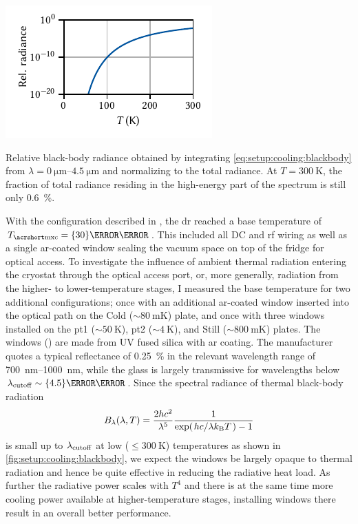 \begin{marginfigure}
    \centering
    \includegraphics{img/pdf/setup/black_body_radiance}
    \caption[]{
        Relative black-body radiance obtained by integrating \cref{eq:setup:cooling:blackbody} from $\lambda = \qtyrange{0}{4.5}{\micro\meter}$ and normalizing to the total radiance.
        At $T=\qty{300}{\kelvin}$, the fraction of total radiance residing in the high-energy part of the spectrum is still only \qty{0.6}{\percent}.
    }
    \label{fig:setup:cooling:blackbody}
\end{marginfigure}

With the configuration described in , the \gls{dr} reached a base temperature of $\Tmxc = \qty{30}{\milli\kelvin}$.
This included all DC and \gls{rf} wiring as well as a single \gls{ar}-coated window sealing the vacuum space on top of the fridge for optical access.
To investigate the influence of ambient thermal radiation entering the cryostat through the optical access port, or, more generally, radiation from the higher- to lower-temperature stages, I measured the base temperature for two additional configurations; once with an additional \gls{ar}-coated window inserted into the optical path on the Cold ($\sim\qty{80}{\milli\kelvin}$) plate, and once with three windows installed on the \gls{pt1} ($\sim\qty{50}{\kelvin}$), \gls{pt2} ($\sim\qty{4}{\kelvin}$), and Still ($\sim\qty{800}{\milli\kelvin}$) plates.
The windows (\thewindow) are made from UV fused silica with \gls{ar} coating.
The manufacturer quotes a typical reflectance of \qty{0.25}{\percent} in the relevant wavelength range of \qtyrange{700}{1000}{\nano\meter}, while the glass is largely transmissive for wavelengths below $\lambda_{\mr{cutoff}}\sim\qty{4.5}{\micro\meter}$.
Since the spectral radiance of thermal black-body radiation~\cite{Planck1900}
\begin{equation}\label{eq:setup:cooling:blackbody}
    B_\lambda(\lambda, T) = \frac{2 h c^2}{\lambda^5}\frac{1}{\exp(\flatfrac{hc}{\lambda\kb T}) - 1}
\end{equation}
is small up to $\lambda_{\mathrm{cutoff}}$ at low ($\leq\qty{300}{\kelvin}$) temperatures as shown in \cref{fig:setup:cooling:blackbody}, we expect the windows be largely opaque to thermal radiation and hence be quite effective in reducing the radiative heat load.
As further the radiative power scales with $T^4$ and there is at the same time more cooling power available at higher-temperature stages, installing windows there result in an overall better performance.

